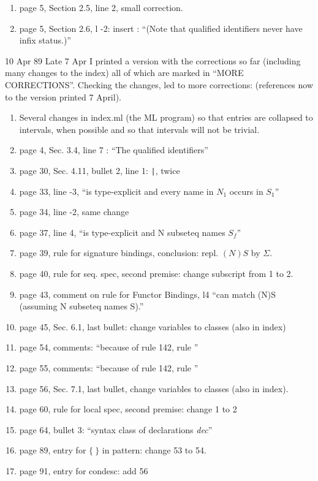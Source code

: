 \begin{description}
\begin{enumerate}
\item page 5, Section 2.5, line 2, small correction.
\item page 5, Section 2.6, l -2: insert : ``(Note that qualified identifiers
      never have infix status.)''
\end{enumerate}
\item{10 Apr 89} Late 7 Apr I printed a version with the corrections
so far (including many changes to the index) all of which are marked
in ``MORE CORRECTIONS''.  Checking the changes, led to more corrections:
(references now to the version printed 7 April).
\begin{enumerate}
\item Several changes in index.ml (the ML program) so that entries
      are collapsed to intervals, when possible and so that intervals
      will not be trivial.
\item page 4, Sec. 3.4, line 7 : ``The qualified identifiers''
\item page 30, Sec. 4.11, bullet 2, line 1: {\tt |}, twice
\item page 33, line -3, ``is type-explicit and every name in $N_1$ occurs
      in $S_1$''
\item page 34, line -2, same change
\item page 37, line 4, ``is type-explicit and N subseteq names $S_f$''
\item page 39, rule for signature bindings, conclusion: repl. 
      $(N)S$ by $\Sigma$.
\item page 40, rule for seq. spec, second premise: change subscript
      from 1 to 2.
\item page 43, comment on rule for Functor Bindings, l4 ``can match (N)S 
      (assuming N subseteq names S).''
\item page 45, Sec. 6.1, last bullet: change variables to classes (also
      in index)
\item page 54, comments: ``because of rule 142, rule ''
\item page 55, comments: ``because of rule 142, rule ''
\item page 56, Sec. 7.1, last bullet, change variables to classes (also
      in index).
\item page 60, rule for local spec, second premise: change 1 to 2
\item page 64, bullet 3: ``syntax class of declarations {\it dec}''
\item page 89, entry for $\{\ \}$ in pattern: change 53 to 54.
\item page 91, entry for condesc: add 56

\end{enumerate}
\end{description}
